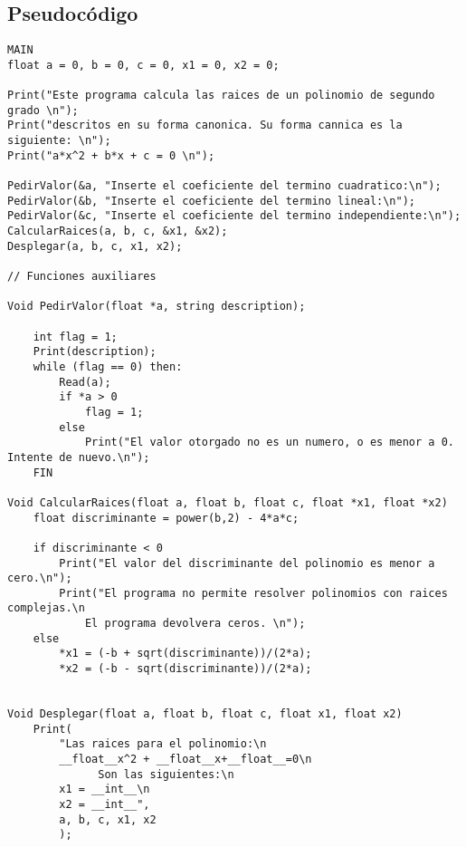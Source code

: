 \documentclass[conference]{IEEEtran}
\begin{document}
    \subsection{Pseudocódigo}
\begin{lstlisting}[style=mystyle]
MAIN
float a = 0, b = 0, c = 0, x1 = 0, x2 = 0;

Print("Este programa calcula las raices de un polinomio de segundo grado \n");
Print("descritos en su forma canonica. Su forma cannica es la siguiente: \n");
Print("a*x^2 + b*x + c = 0 \n");

PedirValor(&a, "Inserte el coeficiente del termino cuadratico:\n");
PedirValor(&b, "Inserte el coeficiente del termino lineal:\n");
PedirValor(&c, "Inserte el coeficiente del termino independiente:\n");
CalcularRaices(a, b, c, &x1, &x2);
Desplegar(a, b, c, x1, x2);

// Funciones auxiliares

Void PedirValor(float *a, string description); 
	
	int flag = 1;
	Print(description);	
	while (flag == 0) then:
		Read(a);
		if *a > 0
			flag = 1;
		else 
			Print("El valor otorgado no es un numero, o es menor a 0. Intente de nuevo.\n");
	FIN

Void CalcularRaices(float a, float b, float c, float *x1, float *x2)
	float discriminante = power(b,2) - 4*a*c;
	
	if discriminante < 0
		Print("El valor del discriminante del polinomio es menor a cero.\n");
		Print("El programa no permite resolver polinomios con raices complejas.\n
			El programa devolvera ceros. \n");
	else 
		*x1 = (-b + sqrt(discriminante))/(2*a);
		*x2 = (-b - sqrt(discriminante))/(2*a);


Void Desplegar(float a, float b, float c, float x1, float x2)
	Print(
		"Las raices para el polinomio:\n
		__float__x^2 + __float__x+__float__=0\n
	          Son las siguientes:\n 
		x1 = __int__\n 
		x2 = __int__", 
		a, b, c, x1, x2
		);
\end{lstlisting}
\end{document}
